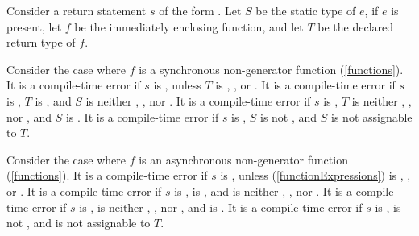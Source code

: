 \documentclass[makeidx]{article}
\begin{document}
{\LMHash{}%
Consider a return statement $s$ of the form .
Let $S$ be the static type of $e$, if $e$ is present,
let $f$ be the immediately enclosing function,
and let $T$ be the declared return type of $f$.

\LMHash{}%
Consider the case where $f$ is a synchronous non-generator function
(\ref{functions}).
%
It is a compile-time error if $s$ is \code{\RETURN;},
unless $T$ is \VOID, \DYNAMIC, or .
%
It is a compile-time error if $s$ is ,
$T$ is \VOID,
and $S$ is neither \VOID, \DYNAMIC, nor .
%
It is a compile-time error if $s$ is ,
$T$ is neither \VOID, \DYNAMIC, nor ,
and $S$ is \VOID.
%
It is a compile-time error if $s$ is ,
$S$ is not \VOID,
and $S$ is not assignable to $T$.

\EndCase

\LMHash{}%
Consider the case where $f$ is an asynchronous non-generator function
(\ref{functions}).
%
It is a compile-time error if $s$ is \code{\RETURN;},
unless 
(\ref{functionExpressions})
is \VOID, \DYNAMIC, or .
%
It is a compile-time error if $s$ is ,
 is \VOID,
and  is neither \VOID, \DYNAMIC, nor .
%
It is a compile-time error if $s$ is ,
 is neither \VOID, \DYNAMIC, nor ,
and  is \VOID.
%
It is a compile-time error if $s$ is ,
 is not \VOID,
and  is not assignable to $T$.

}
\end{document}

